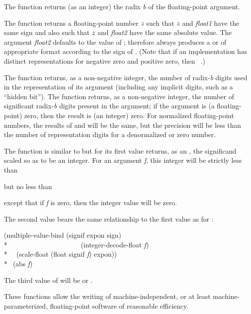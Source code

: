 \begin{defun}[Function]
The function  returns (as an integer)
the radix \emph{b} of the floating-point argument.

The function  returns a floating-point number $\emph{z}$ such
that $\emph{z}$ and \emph{float1} have the same sign and also such that
$\emph{z}$ and \emph{float2} have the same absolute value.
The argument \emph{float2} defaults to the value of ;
 therefore always produces a  or 
of appropriate format
according to the sign of .  (Note that if an implementation
has distinct representations for negative zero and positive zero,
then  \EV\ .)

The function  returns, as a non-negative integer,
the number of radix-\emph{b} digits
used in the representation of its argument (including any implicit
digits, such as a ``hidden bit'').
The function 
returns, as a non-negative integer,
the number of significant radix-\emph{b} digits present in the
argument; if the argument is (a floating-point)
zero, then the result is (an integer) zero.
For normalized floating-point numbers, the results of 
and 
will be the same, but the precision will be less than the
number of representation digits for a denormalized or zero number.

The function  is similar to 
but for its first value returns,
as an , the significand scaled so as to be an integer.
For an argument \emph{f}, this integer will be strictly less than
\begin{lisp}
\end{lisp}
but no less than
\begin{lisp}
\end{lisp}
except that if \emph{f} is zero, then the integer value will be zero.

The second value bears the same relationship to the first value
as for :
\begin{lisp}
(multiple-value-bind (signif expon sign) \\*
~~~~~~~~~~~~~~~~~~~~~(integer-decode-float \emph{f}) \\*
~~(scale-float (float signif \emph{f}) expon)) \\*
\EQ\ (abs \emph{f})
\end{lisp}

The third value of  will be  or .

\beforenoterule
\begin{rationale}
These functions allow the writing of machine-independent,
or at least machine-parameterized, floating-point software of reasonable
efficiency.
\end{rationale}
\afternoterule
\end{defun}

